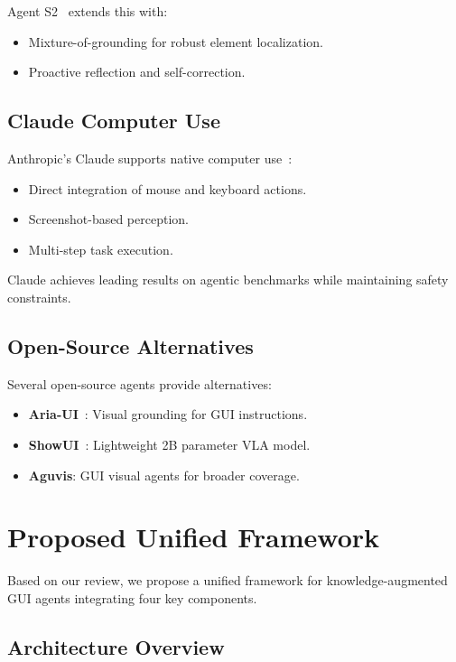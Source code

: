 \documentclass[11pt]{article}
\begin{document}
Agent S2~\cite{agents22025} extends this with:

\begin{itemize}
    \item Mixture-of-grounding for robust element localization.
    \item Proactive reflection and self-correction.
\end{itemize}

\subsection{Claude Computer Use}

Anthropic's Claude supports native computer use~\cite{claudecomputeruse2024}:

\begin{itemize}
    \item Direct integration of mouse and keyboard actions.
    \item Screenshot-based perception.
    \item Multi-step task execution.
\end{itemize}

Claude achieves leading results on agentic benchmarks while maintaining safety constraints.

\subsection{Open-Source Alternatives}

Several open-source agents provide alternatives:

\begin{itemize}
    \item \textbf{Aria-UI}~\cite{ariaui2024}: Visual grounding for GUI instructions.
    \item \textbf{ShowUI}~\cite{showui2024}: Lightweight 2B parameter VLA model.
    \item \textbf{Aguvis}: GUI visual agents for broader coverage.
\end{itemize}

\section{Proposed Unified Framework}
\label{sec:framework}

Based on our review, we propose a unified framework for knowledge-augmented GUI agents integrating four key components.

\subsection{Architecture Overview}
\end{document}
